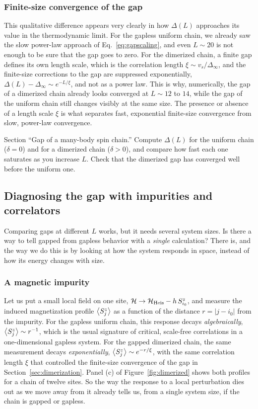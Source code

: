 \documentclass[lecture_notes.tex]{subfiles}
\begin{document}
\subsubsection{Finite-size convergence of the gap}
This qualitative difference appears very clearly in how $\Delta(L)$ approaches its value in the
thermodynamic limit. For the gapless uniform chain, we already saw the slow power-law approach of
Eq.~\eqref{eq:gapscaling}, and even $L\sim20$ is not enough to be sure that the gap goes to zero. For the dimerized chain, a finite gap defines its own length scale, which is the correlation
length $\xi\sim v_s/\Delta_\infty$, and the finite-size corrections to the gap are suppressed
exponentially, $\Delta(L)-\Delta_\infty \sim e^{-L/\xi}$, and not as a power law. This is why,
numerically, the gap of a dimerized chain already looks converged at $L\sim12$ to $14$, while the
gap of the uniform chain still changes visibly at the same size. The presence or absence of a length
scale $\xi$ is what separates fast, exponential finite-size convergence from slow, power-law
convergence.

\begin{notebook}
Section ``Gap of a many-body spin chain.'' Compute $\Delta(L)$ for the uniform chain ($\delta=0$)
and for a dimerized chain ($\delta>0$), and compare how fast each one saturates as you increase
$L$. Check that the dimerized gap has converged well before the uniform one.
\end{notebook}

\subsection{Diagnosing the gap with impurities and correlators}
\label{sec:diagnostics}
Comparing gaps at different $L$ works, but it needs several system sizes. Is there a way to tell
gapped from gapless behavior with a \emph{single} calculation? There is, and the way we do this is by
looking at how the system responds in space, instead of how its energy changes with size.

\subsubsection{A magnetic impurity}
Let us put a small local field on one site, $\mathcal{H}\to\mathcal{H}_{\mathrm{Heis}} - h\,
S_{i_0}^z$, and measure the induced magnetization profile $\expval{S_j^z}$ as a function of the
distance $r=|j-i_0|$ from the impurity. For the gapless uniform chain, this response decays
\emph{algebraically}, $\expval{S_j^z}\sim r^{-1}$, which is the usual signature of critical,
scale-free correlations in a one-dimensional gapless system. For the gapped dimerized chain, the same
measurement decays \emph{exponentially}, $\expval{S_j^z}\sim e^{-r/\xi}$, with the same correlation
length $\xi$ that controlled the finite-size convergence of the gap in
Section~\ref{sec:dimerization}. Panel (c) of Figure~\ref{fig:dimerized} shows both profiles for a
chain of twelve sites. So the way the response to a local perturbation dies out as we move away from
it already tells us, from a single system size, if the chain is gapped or gapless.
\end{document}
